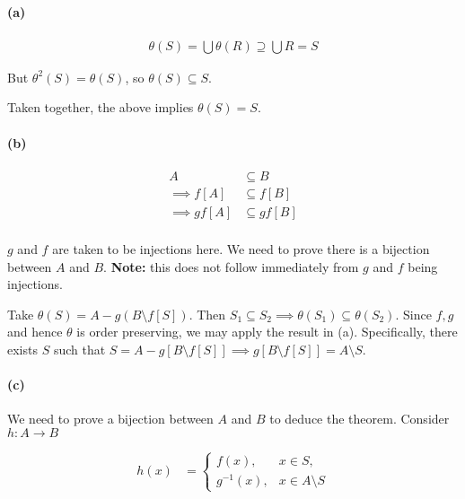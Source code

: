 \documentclass{article}
\begin{document}
\paragraph{(a)}

\begin{align*}
  \theta(S) = \bigcup \theta(R) \supseteq \bigcup R = S
\end{align*}

But $\theta^2(S) = \theta(S)$, so $\theta(S) \subseteq S$.

Taken together, the above implies $\theta(S) = S$.

\paragraph{(b)}
\begin{align*}
  A &\subseteq B \\
  \implies f\left[A\right] &\subseteq f\left[B\right] \\
  \implies gf\left[A\right] &\subseteq gf\left[B\right] \\
\end{align*}

$g$ and $f$ are taken to be injections here. We need to prove there is a bijection between $A$ and $B$. \textbf{Note:} this does not follow immediately from $g$
and $f$ being injections.

Take $\theta(S) = A - g(B \setminus f\left[S\right])$. Then $S_1 \subseteq S_2 \implies \theta(S_1) \subseteq \theta(S_2)$. Since $f, g$ and hence $\theta$ is order preserving, we may apply the result in (a). Specifically, there exists $S$ such that $S = A - g\left[B \setminus f\left[S\right]\right] \implies g\left[B \setminus f\left[S\right]\right] = A \setminus S$.

\paragraph{(c)}

We need to prove a bijection between $A$ and $B$ to deduce the theorem. Consider $h\colon A \rightarrow B$

\begin{align*}
  h(x) &= \begin{cases}
    f(x), & x \in S,  \\
    g^{-1}(x), & x \in A \setminus S
  \end{cases} \\
\end{align*}
\end{document}
